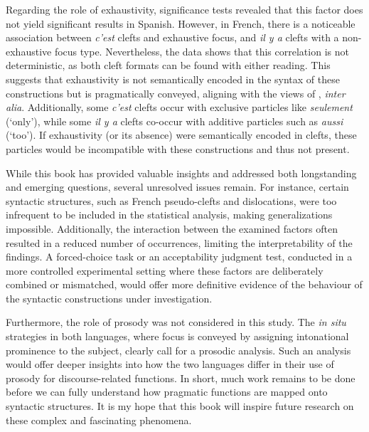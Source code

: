 Regarding the role of exhaustivity, significance tests revealed that this factor does not yield significant results in Spanish. However, in French, there is a noticeable association between \textit{c'est} clefts and exhaustive focus, and \textit{il y a} clefts with a non-exhaustive focus type. Nevertheless, the data shows that this correlation is not deterministic, as both cleft formats can be found with either reading. This suggests that exhaustivity is not semantically encoded in the syntax of these constructions but is pragmatically conveyed, aligning with the views of \textcite{horn1981exhaustiveness, dufter2009clefting, karssenberg2017oiseaux, destruel2018interpretation}, \textit{inter alia}. Additionally, some \textit{c'est} clefts occur with exclusive particles like \textit{seulement} (`only'), while some \textit{il y a} clefts co-occur with additive particles such as \textit{aussi} (`too'). If exhaustivity (or its absence) were semantically encoded in clefts, these particles would be incompatible with these constructions and thus not present.

While this book has provided valuable insights and addressed both longstanding and emerging questions, several unresolved issues remain. For instance, certain syntactic structures, such as French pseudo-clefts and dislocations, were too infrequent to be included in the statistical analysis, making generalizations impossible. Additionally, the interaction between the examined factors often resulted in a reduced number of occurrences, limiting the interpretability of the findings. A forced-choice task or an acceptability judgment test, conducted in a more controlled experimental setting where these factors are deliberately combined or mismatched, would offer more definitive evidence of the behaviour of the syntactic constructions under investigation.

Furthermore, the role of prosody was not considered in this study. The \textit{in situ} strategies in both languages, where focus is conveyed by assigning intonational prominence to the subject, clearly call for a prosodic analysis. Such an analysis would offer deeper insights into how the two languages differ in their use of prosody for discourse-related functions.
In short, much work remains to be done before we can fully understand how pragmatic functions are mapped onto syntactic structures. It is my hope that this book will inspire future research on these complex and fascinating phenomena.
